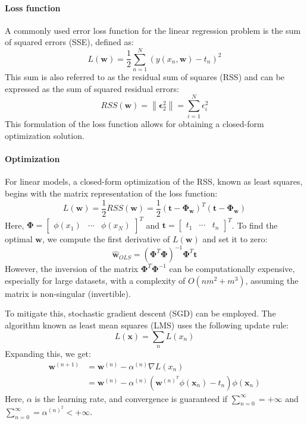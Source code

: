 \paragraph*{Loss function}
A commonly used error loss function for the linear regression problem is the sum of squared errors (SSE), defined as:
\[L(\textbf{w})=\dfrac{1}{2}\sum_{n=1}^{N}{\left( y(x_n, \textbf{w})-t_n \right)}^2\]
This sum is also referred to as the residual sum of squares (RSS) and can be expressed as the sum of squared residual errors:
\[RSS(\textbf{w})=\left\lVert \boldsymbol{\epsilon}^2_2 \right\rVert = \sum_{i=1}^{N}\epsilon^2_i \]
This formulation of the loss function allows for obtaining a closed-form optimization solution.

\paragraph*{Optimization}
For linear models, a closed-form optimization of the RSS, known as least squares, begins with the matrix representation of the loss function:
\[L(\textbf{w})=\dfrac{1}{2}RSS(\textbf{w})=\dfrac{1}{2}{\left( \textbf{t}-\boldsymbol{\Phi}_{\textbf{w}} \right)}^T\left( \textbf{t}-\boldsymbol{\Phi}_{\textbf{w}} \right)\]
Here, $\boldsymbol{\Phi}=\begin{bmatrix} \phi(x_1) & \cdots & \phi(x_N)\end{bmatrix}^T$ and $\textbf{t}=\begin{bmatrix}t_1 & \cdots & t_n\end{bmatrix}^T$.
To find the optimal $\textbf{w}$, we compute the first derivative of $L(\textbf{w})$ and set it to zero:
\[\hat{\textbf{w}}_{OLS}={\left( \boldsymbol{\Phi}^T\boldsymbol{\Phi}\right)}^{-1}\boldsymbol{\Phi}^T\textbf{t}\]
However, the inversion of the matrix $\boldsymbol{\Phi}^T\boldsymbol{\Phi}^{-1}$ can be computationally expensive, especially for large datasets, with a complexity of $O(nm^2+m^3)$, assuming the matrix is non-singular (invertible). 

To mitigate this, stochastic gradient descent (SGD) can be employed. 
The algorithm known as least mean squares (LMS) uses the following update rule:
\[L(\textbf{x})=\sum_n L(x_n)\]
Expanding this, we get:
\begin{align*}
    \textbf{w}^{(n+1)}  &= \textbf{w}^{(n)}-\alpha^{(n)}\nabla L(x_n) \\
                        &= \textbf{w}^{(n)}-\alpha^{(n)}\left( \textbf{w}^{{(n)}^T}\phi(\textbf{x}_n)-t_n \right)\phi(\textbf{x}_n)
\end{align*}
Here, $\alpha$ is the learning rate, and convergence is guaranteed if $\sum_{n=0}^{\infty}=+\infty$ and $\sum_{n=0}^{\infty}=\alpha^{{(n)}^2}<+\infty$.

